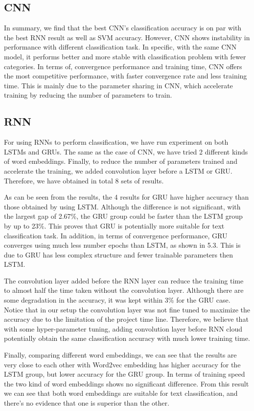 \documentclass{article}
\begin{document}
\subsection{CNN}
In summary, we find that the best CNN’s classification accuracy is on par with the best RNN result as well as SVM accuracy. However, CNN shows instability in performance with different classification task. In specific, with the same CNN model, it performs better and more stable with classification problem with fewer categories. In terms of, convergence performance and training time, CNN offers the most competitive performance, with faster convergence rate and less training time. This is mainly due to the parameter sharing in CNN, which accelerate training by reducing the number of parameters to train.


\subsection{RNN}
For using RNNs to perform classification, we have run experiment on both LSTMs and GRUs. The same as the case of CNN, we have tried 2 different kinds of word embeddings. Finally, to reduce the number of parameters trained and accelerate the training, we added convolution layer before a LSTM or GRU. Therefore, we have obtained in total 8 sets of results.

As can be seen from the results, the 4 results for GRU have higher accuracy than those obtained by using LSTM. Although the difference is not significant, with the largest gap of 2.67\%, the GRU group could be faster than the LSTM group by up to  23\%. This proves that GRU is potentially more suitable for text classification task.  In addition, in terms of convergence performance, GRU converges using much less number epochs than LSTM, as shown in 5.3. This is due to GRU has less complex structure and fewer trainable parameters then LSTM.

The convolution layer added before the RNN layer can reduce the training time to almost half the time taken without the convolution layer. Although there are some degradation in the accuracy, it was kept within 3\% for the GRU case. Notice that  in our setup the convolution layer was not fine tuned to maximize the accuracy due to the limitation of the project time line. Therefore, we believe that with some hyper-parameter tuning, adding convolution layer before RNN cloud potentially obtain the same classification accuracy with much lower training time.

Finally, comparing different word embeddings, we can see that the results are very close to each other with Word2vec embedding has higher accuracy for the LSTM group, but lower accuracy for the GRU group. In terms of training speed the two kind of word embeddings shows no significant difference. From this result we can see that both word embeddings are suitable for text classification, and there's no evidence that one is superior than the other.
\end{document}
